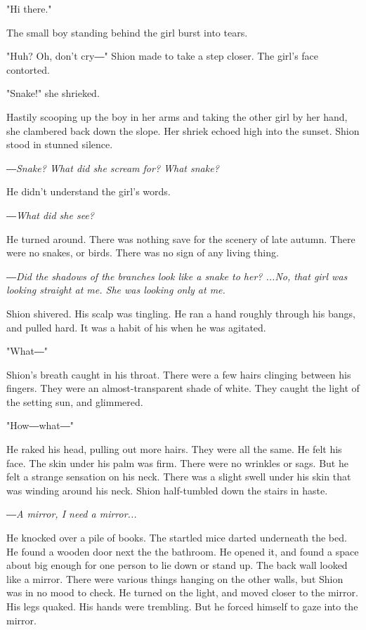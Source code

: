 "Hi there."

The small boy standing behind the girl burst into tears.

"Huh? Oh, don't cry―" Shion made to take a step closer. The girl's face
contorted.

"Snake!" she shrieked.

Hastily scooping up the boy in her arms and taking the other girl by her
hand, she clambered back down the slope. Her shriek echoed high into the
sunset. Shion stood in stunned silence.

\emph{―Snake? What did she scream for? What snake?}

He didn't understand the girl's words.

\emph{―What did she see?}

He turned around. There was nothing save for the scenery of late autumn.
There were no snakes, or birds. There was no sign of any living thing.

\emph{―Did the shadows of the branches look like a snake to her? ...No, that
	girl was looking straight at me. She was looking only at me.}

Shion shivered. His scalp was tingling. He ran a hand roughly through
his bangs, and pulled hard. It was a habit of his when he was agitated.

"What―"

Shion's breath caught in his throat. There were a few hairs clinging
between his fingers. They were an almost-transparent shade of white.
They caught the light of the setting sun, and glimmered.

"How―what―"

He raked his head, pulling out more hairs. They were all the same. He
felt his face. The skin under his palm was firm. There were no wrinkles
or sags. But he felt a strange sensation on his neck. There was a slight
swell under his skin that was winding around his neck. Shion
half-tumbled down the stairs in haste.

\emph{―A mirror, I need a mirror...}

He knocked over a pile of books. The startled mice darted underneath the
bed. He found a wooden door next the the bathroom. He opened it, and
found a space about big enough for one person to lie down or stand up.
The back wall looked like a mirror. There were various things hanging on
the other walls, but Shion was in no mood to check. He turned on the
light, and moved closer to the mirror. His legs quaked. His hands were
trembling. But he forced himself to gaze into the mirror.

